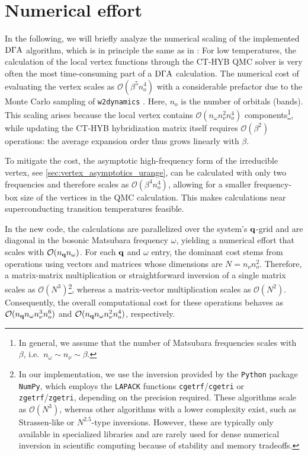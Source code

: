 \documentclass[../../main.tex]{subfiles}
\begin{document}
\section{Numerical effort}

In the following, we will briefly analyze the numerical scaling of the implemented $\text{D}\Gamma\text{A}$ algorithm, which is in principle the same as in \cite{Galler2019}: For low temperatures, the calculation of the local vertex functions through the CT-HYB QMC solver is very often the most time-consuming part of a $\text{D}\Gamma\text{A}$ calculation. The numerical cost of evaluating the vertex scales as $\mathcal{O}(\beta^5 n_{o}^4)$ with a considerable prefactor due to the Monte Carlo sampling of \texttt{w2dynamics} \cite{Wallerberger2019}. Here, $n_{o}$ is the number of orbitals (bands). This scaling arises because the local vertex contains $\mathcal{O}(n_{\omega}n_{\nu}^2n_{o}^4)$ components\footnote{In general, we assume that the number of Matsubara frequencies scales with $\beta$, i.e.\ $n_{\omega}\sim n_{\nu}\sim\beta$.}, while updating the CT-HYB hybridization matrix itself requires $\mathcal{O}(\beta^2)$ operations: the average expansion order thus grows linearly with $\beta$.

To mitigate the cost, the asymptotic high-frequency form of the irreducible vertex, see \ref{sec:vertex_asymptotics_urange}, can be calculated with only two frequencies and therefore scales as $\mathcal{O}(\beta^4 n_{o}^4)$, allowing for a smaller frequency-box size of the vertices in the QMC calculation. This makes calculations near superconducting transition temperatures feasible.

In the new code, the calculations are parallelized over the system's $\textbf{q}$-grid and are diagonal in the bosonic Matsubara frequency $\omega$, yielding a numerical effort that scales with $\mathcal{O}(n_{\textbf{q}}n_{\omega})$. For each $\textbf{q}$ and $\omega$ entry, the dominant cost stems from operations using vectors and matrices whose dimensions are $N=n_{\nu}n_{o}^2$. Therefore, a matrix-matrix multiplication or straightforward inversion of a single matrix scales as $\mathcal{O}(N^3)$\footnote{In our implementation, we use the inversion provided by the \texttt{Python} package \texttt{NumPy}, which employs the \texttt{LAPACK} functions \texttt{cgetrf}/\texttt{cgetri} or \texttt{zgetrf}/\texttt{zgetri}, depending on the precision required. These algorithms scale as $\mathcal{O}(N^3)$, whereas other algorithms with a lower complexity exist, such as Strassen-like or $N^{2.5}$-type inversions. However, these are typically only available in specialized libraries and are rarely used for dense numerical inversion in scientific computing because of stability and memory tradeoffs.}, whereas a matrix-vector multiplication scales as $\mathcal{O}(N^2)$. Consequently, the overall computational cost for these operations behaves as $\mathcal{O}(n_{\textbf{q}}n_{\omega}n_{\nu}^3n_{o}^6)$ and $\mathcal{O}(n_{\textbf{q}}n_{\omega}n_{\nu}^2n_{o}^4)$, respectively.
\end{document}
